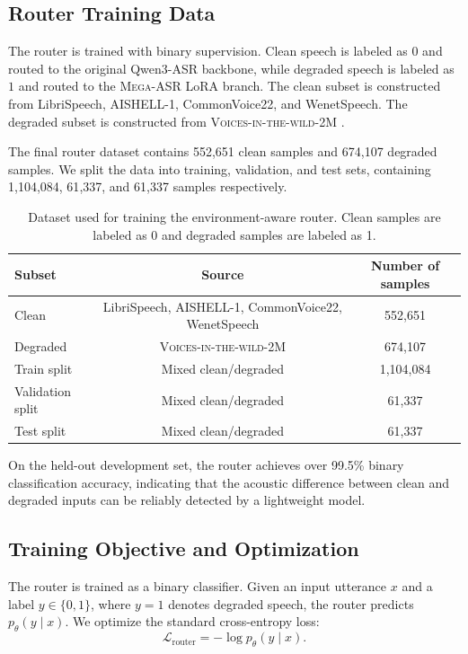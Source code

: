 \documentclass{llmxive}
\begin{document}
\subsection{Router Training Data}

The router is trained with binary supervision. Clean speech is labeled as
$0$ and routed to the original Qwen3-ASR backbone, while degraded speech is
labeled as $1$ and routed to the \textsc{Mega-ASR} LoRA branch. The clean subset is
constructed from LibriSpeech, AISHELL-1, CommonVoice22, and WenetSpeech. The
degraded subset is constructed from  \textsc{Voices-in-the-wild-2M} .

The final router dataset contains 552{,}651 clean samples and 674{,}107 degraded
samples. We split the data into training, validation, and test sets, containing
1{,}104{,}084, 61{,}337, and 61{,}337 samples respectively.

\begin{table}[t]
\centering
\small
\begin{tabular}{lcc}
\toprule
\textbf{Subset} & \textbf{Source} & \textbf{Number of samples} \\
\midrule
Clean & LibriSpeech, AISHELL-1, CommonVoice22, WenetSpeech & 552{,}651 \\
Degraded &  \textsc{Voices-in-the-wild-2M}  & 674{,}107 \\
\midrule
Train split & Mixed clean/degraded & 1{,}104{,}084 \\
Validation split & Mixed clean/degraded & 61{,}337 \\
Test split & Mixed clean/degraded & 61{,}337 \\
\bottomrule
\end{tabular}
\caption{Dataset used for training the environment-aware router. Clean samples are labeled as 0 and degraded samples are labeled as 1.}
\label{tab:router_dataset}
\end{table}

On the held-out development set, the router achieves over 99.5\% binary
classification accuracy, indicating that the acoustic difference between clean
and degraded inputs can be reliably detected by a lightweight model.

\subsection{Training Objective and Optimization}

The router is trained as a binary classifier. Given an input utterance $x$ and
a label $y\in\{0,1\}$, where $y=1$ denotes degraded speech, the router predicts
$p_\theta(y\mid x)$. We optimize the standard cross-entropy loss:
\[
\mathcal{L}_{\mathrm{router}}
=
-\log p_\theta(y\mid x).
\]
\end{document}
